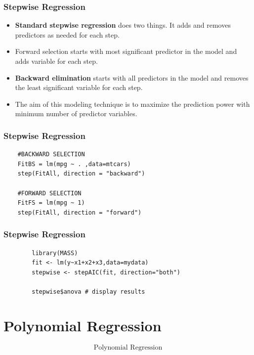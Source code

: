 \documentclass{beamer}
\begin{document}
\begin{frame}
	\frametitle{Stepwise Regression}
	\Large
	\begin{itemize}
		\item \textbf{Standard stepwise regression} does two things. It adds and removes predictors as needed for each step.
		\item Forward selection starts with most significant predictor in the model and adds variable for each step.
		\item \textbf{Backward elimination} starts with all predictors in the model and removes the least significant variable for each step.
		\item The aim of this modeling technique is to maximize the prediction power with minimum number of predictor variables. \end{itemize}
	
\end{frame}
\begin{frame}[fragile]
\frametitle{Stepwise Regression}
\Large
\begin{framed}
	\begin{verbatim}
	#BACKWARD SELECTION
	FitBS = lm(mpg ~ . ,data=mtcars)
	step(FitAll, direction = "backward")
	
	#FORWARD SELECTION
	FitFS = lm(mpg ~ 1)
	step(FitAll, direction = "forward")
	\end{verbatim}
	\end{framed}
\end{frame}

\begin{frame}[fragile]
	\frametitle{Stepwise Regression}
	\Large
	\begin{framed}
		\begin{verbatim}
		library(MASS)
		fit <- lm(y~x1+x2+x3,data=mydata)
		stepwise <- stepAIC(fit, direction="both")
		
		stepwise$anova # display results
	\end{verbatim}
\end{framed}
\end{frame}

\section{Polynomial Regression}
\begin{frame}
	\LARGE
	\[\mbox{Polynomial Regression}\]
\end{frame}
\end{document}

